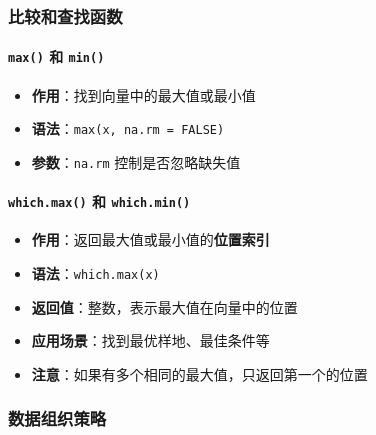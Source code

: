 \documentclass[
  twoside]{book}
\providecommand{\tightlist}{%
  \setlength{\itemsep}{0pt}\setlength{\parskip}{0pt}}
\begin{document}
\hypertarget{ux6bd4ux8f83ux548cux67e5ux627eux51fdux6570}{%
\subsubsection{比较和查找函数}\label{ux6bd4ux8f83ux548cux67e5ux627eux51fdux6570}}

\hypertarget{max-ux548c-min}{%
\paragraph{\texorpdfstring{\texttt{max()} 和 \texttt{min()}}{max() 和 min()}}\label{max-ux548c-min}}

\begin{itemize}
\tightlist
\item
  \textbf{作用}：找到向量中的最大值或最小值
\item
  \textbf{语法}：\texttt{max(x,\ na.rm\ =\ FALSE)}
\item
  \textbf{参数}：\texttt{na.rm} 控制是否忽略缺失值
\end{itemize}

\hypertarget{which.max-ux548c-which.min}{%
\paragraph{\texorpdfstring{\texttt{which.max()} 和 \texttt{which.min()}}{which.max() 和 which.min()}}\label{which.max-ux548c-which.min}}

\begin{itemize}
\tightlist
\item
  \textbf{作用}：返回最大值或最小值的\textbf{位置索引}
\item
  \textbf{语法}：\texttt{which.max(x)}
\item
  \textbf{返回值}：整数，表示最大值在向量中的位置
\item
  \textbf{应用场景}：找到最优样地、最佳条件等
\item
  \textbf{注意}：如果有多个相同的最大值，只返回第一个的位置
\end{itemize}

\hypertarget{ux6570ux636eux7ec4ux7ec7ux7b56ux7565}{%
\subsubsection{数据组织策略}\label{ux6570ux636eux7ec4ux7ec7ux7b56ux7565}}
\end{document}
